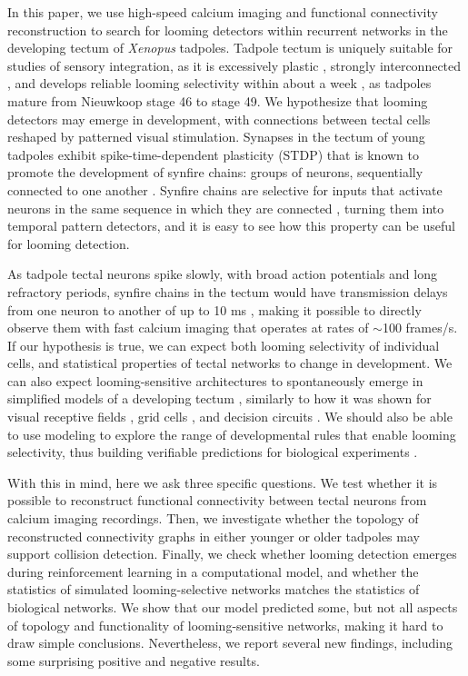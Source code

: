 \documentclass{article}
\begin{document}
In this paper, we use high-speed calcium imaging and functional connectivity reconstruction to search for looming detectors within recurrent networks in the developing tectum of \textit{Xenopus} tadpoles. Tadpole tectum is uniquely suitable for studies of sensory integration, as it is excessively plastic \citep{pratt2007intrinsic, busch2019}, strongly interconnected \citep{james2015}, and develops reliable looming selectivity within about a week \citep{dong2009, khakhalin2014}, as tadpoles mature from Nieuwkoop stage 46 to stage 49. We hypothesize that looming detectors may emerge in development, with connections between tectal cells reshaped by patterned visual stimulation. Synapses in the tectum of young tadpoles exhibit spike-time-dependent plasticity (STDP) \citep{zhang1998stdp, mu2006stdp, vislay2006rf, richards2010stdp} that is known to promote the development of synfire chains: groups of neurons, sequentially connected to one another \citep{fiete2010chains, zheng2014synfire}. Synfire chains are selective for inputs that activate neurons in the same sequence in which they are connected \citep{clopath2010stdpcoding}, turning them into temporal pattern detectors, and it is easy to see how this property can be useful for looming detection.

As tadpole tectal neurons spike slowly, with broad action potentials and long refractory periods, synfire chains in the tectum would have transmission delays from one neuron to another of up to 10 ms \citep{ciarleglio2015, jang2016, busch2019}, making it possible to directly observe them with fast calcium imaging that operates at rates of $\sim$100 frames/s. If our hypothesis is true, we can expect both looming selectivity of individual cells, and statistical properties of tectal networks to change in development. We can also expect looming-sensitive architectures to spontaneously emerge in simplified models of a developing tectum \citep{gao2015simplicity, pietri2017emergence}, similarly to how it was shown for visual receptive fields \citep{bashivan2018neural}, grid cells \citep{banino2018grid}, and decision circuits \citep{haesemeyer2018convergent}. We should also be able to use modeling to explore the range of developmental rules that enable looming selectivity, thus building verifiable predictions for biological experiments \citep{linderman2017constrain, bassett2018models}. 

With this in mind, here we ask three specific questions. We test whether it is possible to reconstruct functional connectivity between tectal neurons from calcium imaging recordings. Then, we investigate whether the topology of reconstructed connectivity graphs in either younger or older tadpoles may support collision detection. Finally, we check whether looming detection emerges during reinforcement learning in a computational model, and whether the statistics of simulated looming-selective networks matches the statistics of biological networks. We show that our model predicted some, but not all aspects of topology and functionality of looming-sensitive networks, making it hard to draw simple conclusions. Nevertheless, we report several new findings, including some surprising positive and negative results.
\end{document}

